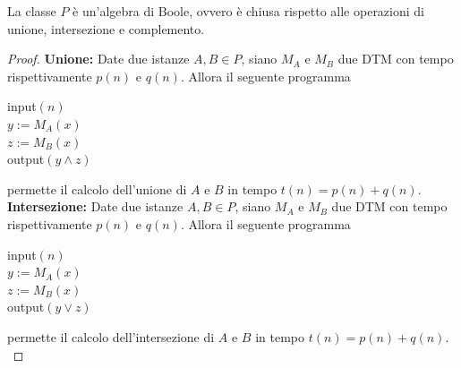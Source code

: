 \begin{theor}
	La classe $P$ è un'algebra di Boole, ovvero è chiusa rispetto alle operazioni di unione, intersezione e complemento.
\end{theor}
\begin{proof}
	
	\textbf{Unione:} Date due istanze $A,B \in P$, siano $M_A$ e $M_B$ due DTM con tempo rispettivamente $p(n)$ e $q(n)$. Allora il seguente programma
	\begin{center}
		\begin{minipage}{.33\textwidth}
			\begin{tcolorbox}[
				colback=white,
				sharp corners,
				boxrule=.3mm,
				left=20pt,
				top=0pt,
				bottom=0pt,
				colbacktitle=white,
				coltitle=black
				]
				\begin{algorithm}[H]
					\SetAlgoNoEnd
					input$(n)$\\
					$y := M_A (x)$\\
					$z := M_B (x)$ \\
					output$(y \wedge z)$
				\end{algorithm}
			\end{tcolorbox}
		\end{minipage}
	\end{center}
	permette il calcolo dell'unione di $A$ e $B$ in tempo $t(n) = p(n) + q(n)$.\\
	
	\textbf{Intersezione:} Date due istanze $A,B \in P$, siano $M_A$ e $M_B$ due DTM con tempo rispettivamente $p(n)$ e $q(n)$. Allora il seguente programma
	\begin{center}
		\begin{minipage}{.33\textwidth}
			\begin{tcolorbox}[
				colback=white,
				sharp corners,
				boxrule=.3mm,
				left=20pt,
				top=0pt,
				bottom=0pt,
				colbacktitle=white,
				coltitle=black
				]
				\begin{algorithm}[H]
					\SetAlgoNoEnd
					input$(n)$\\
					$y := M_A (x)$\\
					$z := M_B (x)$ \\
					output$(y \vee z)$
				\end{algorithm}
			\end{tcolorbox}
		\end{minipage}
	\end{center}
	permette il calcolo dell'intersezione di $A$ e $B$ in tempo $t(n) = p(n) + q(n)$.\\
	

\end{proof}
